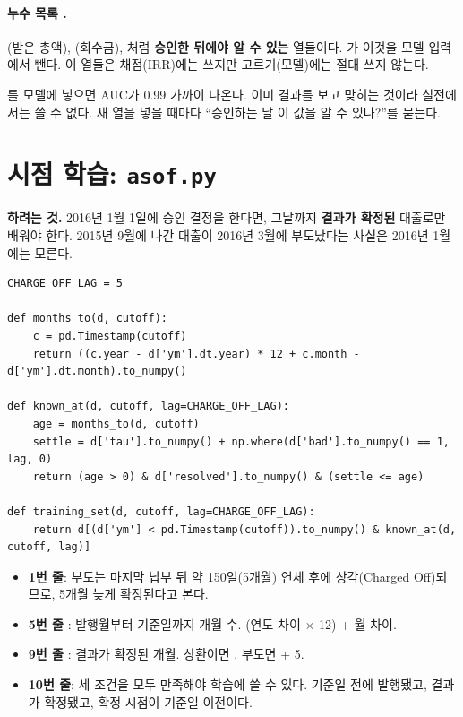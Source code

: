 \paragraph{누수 목록 .} (받은 총액), (회수금), 처럼 \textbf{승인한 뒤에야 알 수 있는} 열들이다. 가 이것을 모델 입력에서 뺀다. 이 열들은 채점(IRR)에는 쓰지만 고르기(모델)에는 절대 쓰지 않는다.
\begin{warnbox}[누수]
를 모델에 넣으면 AUC가 0.99 가까이 나온다. 이미 결과를 보고 맞히는 것이라 실전에서는 쓸 수 없다. 새 열을 넣을 때마다 ``승인하는 날 이 값을 알 수 있나?''를 묻는다.
\end{warnbox}

\section{시점 학습: \texttt{asof.py}}
\textbf{하려는 것.} 2016년 1월 1일에 승인 결정을 한다면, 그날까지 \textbf{결과가 확정된} 대출로만 배워야 한다. 2015년 9월에 나간 대출이 2016년 3월에 부도났다는 사실은 2016년 1월에는 모른다.
\begin{lstlisting}
CHARGE_OFF_LAG = 5

def months_to(d, cutoff):
    c = pd.Timestamp(cutoff)
    return ((c.year - d['ym'].dt.year) * 12 + c.month - d['ym'].dt.month).to_numpy()

def known_at(d, cutoff, lag=CHARGE_OFF_LAG):
    age = months_to(d, cutoff)
    settle = d['tau'].to_numpy() + np.where(d['bad'].to_numpy() == 1, lag, 0)
    return (age > 0) & d['resolved'].to_numpy() & (settle <= age)

def training_set(d, cutoff, lag=CHARGE_OFF_LAG):
    return d[(d['ym'] < pd.Timestamp(cutoff)).to_numpy() & known_at(d, cutoff, lag)]
\end{lstlisting}
\begin{itemize}[leftmargin=*]
\item \textbf{1번 줄}: 부도는 마지막 납부 뒤 약 150일(5개월) 연체 후에 상각(Charged Off)되므로, 5개월 늦게 확정된다고 본다.
\item \textbf{5번 줄} : 발행월부터 기준일까지 개월 수. (연도 차이 \ensuremath{\times} 12) + 월 차이.
\item \textbf{9번 줄} : 결과가 확정된 개월. 상환이면 , 부도면  + 5.
\item \textbf{10번 줄}: 세 조건을 모두 만족해야 학습에 쓸 수 있다. 기준일 전에 발행됐고, 결과가 확정됐고, 확정 시점이 기준일 이전이다.
\end{itemize}
